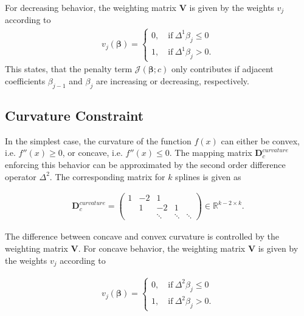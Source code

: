 \documentclass[10pt,a4paper]{article}
\begin{document}
	For decreasing behavior, the weighting matrix $\boldsymbol{V}$ is given by the weights $v_j$ according to
	\begin{align} \label{eq:v_monoton_dec}
		v_j(\boldsymbol{\beta}) = \begin{cases} 0, \quad \text{if} \ \Delta^1\beta_j \le 0 \\ 
						    					1, \quad \text{if} \ \Delta^1\beta_j > 0.
			\end{cases}	
	\end{align}
	This states, that the penalty term $\mathcal{J}(\boldsymbol{\beta}; c)$ only contributes if adjacent coefficients $\beta_{j-1}$ and $\beta_j$ are increasing or decreasing, respectively. \cite{hofner2011monotonicity} \cite{eilers2005unimodal}

	\subsection{Curvature Constraint}
	
	In the simplest case, the curvature of the function $f(x)$ can either be convex, i.e. $f''(x) \ge 0$, or concave, i.e. $f''(x) \le 0$. The mapping matrix $\boldsymbol{D}_c^{curvature}$ enforcing this behavior can be approximated by the second order difference operator $\Delta^2$. The corresponding matrix for $k$ splines is given as

	\begin{align} \label{eq:D_c_curvature}
		\boldsymbol{D}_c^{curvature} = \begin{pmatrix} 1 & -2 & 1 		&  		 & \\ 
														 & 1  &-2 	    &1 		 & \\
														 & 	  & \ddots  & \ddots & \ddots  
										\end{pmatrix} \in \mathbb{R}^{k-2 \times k}.
	\end{align}	
	
	The difference between concave and convex curvature is controlled by the weighting matrix $\boldsymbol{V}$. For concave behavior, the weighting matrix $\boldsymbol{V}$ is given by the weights $v_j$ according to
	
	\begin{align}\label{eq:v_curvature_concave}
		v_j(\boldsymbol{\beta}) = \begin{cases} 
										0, \quad \text{if} \ \Delta^2\beta_j \le 0 \\ 
										1, \quad \text{if} \ \Delta^2\beta_j > 0. 
								   \end{cases}
	\end{align}
	
\end{document}
